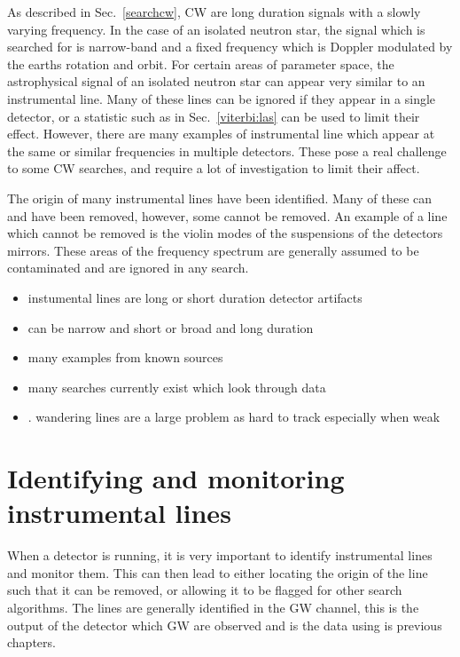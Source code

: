 As described in Sec.~\ref{searchcw}, \ac{CW} are long duration signals with a slowly varying frequency.
In the case of an isolated neutron star, the signal which is searched for is narrow-band and a fixed frequency which is Doppler modulated by the earths rotation and orbit.
For certain areas of parameter space, the astrophysical signal of an isolated neutron star can appear very similar to an instrumental line. 
Many of these lines can be ignored if they appear in a single detector, or a statistic such as in Sec.~\ref{viterbi:las} can be used to limit their effect.
However, there are many examples of instrumental line which appear at the same or similar frequencies in multiple detectors.
These pose a real challenge to some \ac{CW} searches, and require a lot of investigation to limit their affect.


The origin of many instrumental lines have been identified.
Many of these can and have been removed, however, some cannot be removed. 
An example of a line which cannot be removed is the violin modes of the suspensions of the detectors mirrors. 
These areas of the frequency spectrum are generally assumed to be contaminated and are ignored in any search.




\begin{itemize}
    \item instumental lines are long or short duration detector artifacts
    \item can be narrow and short or broad and long duration
    \item many examples from known sources
    \item many searches currently exist which look through data
    \item . wandering lines are a large problem as hard to track especially when weak
\end{itemize}

\section{Identifying and monitoring instrumental lines}

When a detector is running, it is very important to identify instrumental lines and monitor them.
This can then lead to either locating the origin of the line such that it can be removed, or allowing it to be flagged for other search algorithms.
The lines are generally identified in the \ac{GW} channel, this is the output of the detector which \ac{GW} are observed and is the data using is previous chapters.

